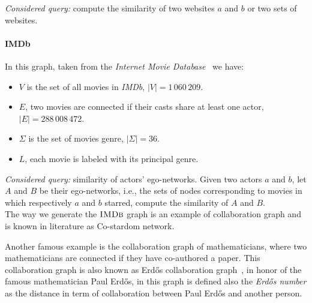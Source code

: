     
    \textsl{Considered query:} compute the similarity of two websites $a$ and $b$ or two sets of websites.
    
    \paragraph*{IMDb} In this graph, taken from the \textit{Internet Movie Database}~\cite{imdb} we have:
    
    \begin{itemize}
    	\item $V$ is the set of all movies in \textit{IMDb},  $|V| = 1\,060\,209$.
		\item $E$, two movies are connected if their casts share at least one actor, $|E| = 288\,008\,472$.
		\item $\Sigma$ is the set of movies genre, $|\Sigma| = 36$.
		\item $L$, each movie is labeled with its principal genre.
    \end{itemize}
    
    
    \textsl{Considered query:} similarity of actors' ego-networks. Given two actors $a$ and $b$, let $A$ and $B$ be their ego-networks, i.e., the sets of nodes corresponding to movies in which respectively $a$ and $b$ starred, compute the similarity of $A$ and $B$.\\
    
    The way we generate the $\textsc{IMDb}$ graph is an example of collaboration graph and is known in literature as Co-stardom network. 
    
    Another famous example is the collaboration graph of mathematicians, where two mathematicians are connected if they have co-authored a paper. 
    This collaboration graph is also known as Erdős collaboration graph~\cite{BATAGELJ2000173}, in honor of the famous mathematician Paul Erdős, in this graph is defined also the \textit{Erdős number} as the distance in term of collaboration between Paul Erdős and another person.
    
